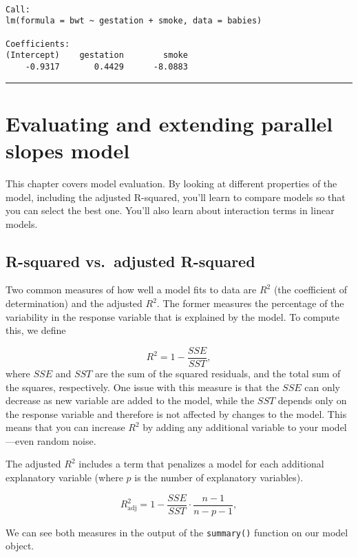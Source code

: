 \documentclass[]{book}
\begin{document}
\begin{verbatim}

Call:
lm(formula = bwt ~ gestation + smoke, data = babies)

Coefficients:
(Intercept)    gestation        smoke  
    -0.9317       0.4429      -8.0883  
\end{verbatim}

\begin{center}\rule{0.5\linewidth}{\linethickness}\end{center}

\chapter{Evaluating and extending parallel slopes
model}\label{evaluating-and-extending-parallel-slopes-model}

This chapter covers model evaluation. By looking at different properties
of the model, including the adjusted R-squared, you'll learn to compare
models so that you can select the best one. You'll also learn about
interaction terms in linear models.

\section{R-squared vs.~adjusted
R-squared}\label{r-squared-vs.adjusted-r-squared}

Two common measures of how well a model fits to data are \(R^2\) (the
coefficient of determination) and the adjusted \(R^2\). The former
measures the percentage of the variability in the response variable that
is explained by the model. To compute this, we define

\[R^2 = 1 − \frac{SSE}{SST},\] where \(SSE\) and \(SST\) are the sum of
the squared residuals, and the total sum of the squares, respectively.
One issue with this measure is that the \(SSE\) can only decrease as new
variable are added to the model, while the \(SST\) depends only on the
response variable and therefore is not affected by changes to the model.
This means that you can increase \(R^2\) by adding any additional
variable to your model---even random noise.

The adjusted \(R^2\) includes a term that penalizes a model for each
additional explanatory variable (where \(p\) is the number of
explanatory variables).

\[R^2_{\text{adj}} = 1 − \frac{SSE}{SST}\cdot\frac{n-1}{n-p-1},\]

We can see both measures in the output of the \texttt{summary()}
function on our model object.
\end{document}
